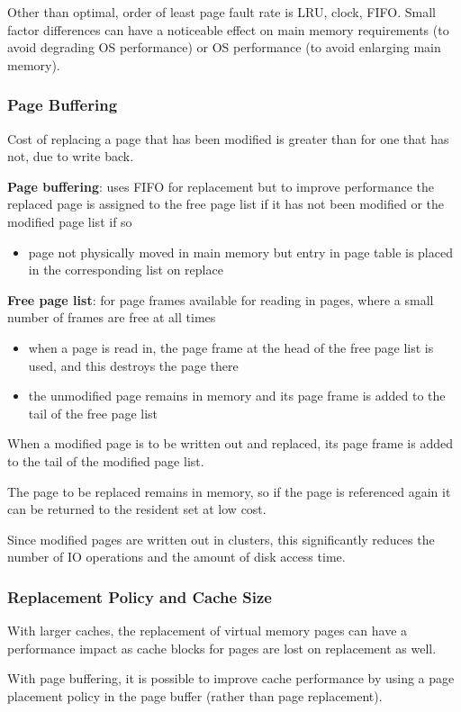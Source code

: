 \documentclass[11pt]{article}
\begin{document}
Other than optimal, order of least page fault rate is LRU, clock, FIFO.
Small factor differences can have a noticeable effect on main memory requirements
(to avoid degrading OS performance) or OS performance (to avoid enlarging main
memory).
\subsubsection{Page Buffering}
\label{sec:org83639b0}
Cost of replacing a page that has been modified is greater
than for one that has not, due to write back.

\textbf{Page buffering}: uses FIFO for replacement but to improve performance the replaced
page is assigned to the free page list if it has not been modified or the modified
page list if so
\begin{itemize}
\item page not physically moved in main memory but entry in page table is placed in
the corresponding list on replace
\end{itemize}

\textbf{Free page list}: for page frames available for reading in pages, where a small
number of frames are free at all times
\begin{itemize}
\item when a page is read in, the page frame at the head of the free page list is
used, and this destroys the page there
\item the unmodified page remains in memory and its page frame is added to the tail
of the free page list
\end{itemize}

When a modified page is to be written out and replaced, its page frame is added
to the tail of the modified page list.

The page to be replaced remains in memory, so if the page is referenced again
it can be returned to the resident set at low cost.

Since modified pages are written out in clusters, this significantly reduces the
number of IO operations and the amount of disk access time.
\subsubsection{Replacement Policy and Cache Size}
\label{sec:org963402c}
With larger caches, the replacement of virtual memory pages can have a
performance impact as cache blocks for pages are lost on replacement as well.

With page buffering, it is possible to improve cache performance by using a page
placement policy in the page buffer (rather than page replacement).
\end{document}
